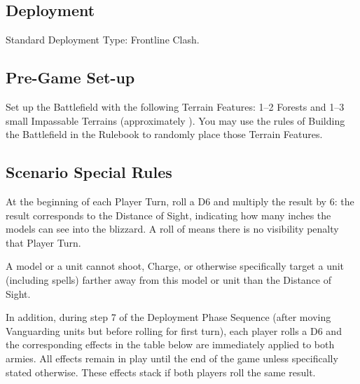 
\label{WeathertheStorm}


\subsection*{Deployment}

Standard Deployment Type: Frontline Clash.


\subsection*{Pre-Game Set-up}

Set up the Battlefield with the following Terrain Features: 1--2 Forests and 1--3 small Impassable Terrains (approximately ). You may use the rules of Building the Battlefield in the Rulebook to randomly place those Terrain Features.

\subsection*{Scenario Special Rules}

At the beginning of each Player Turn, roll a D6 and multiply the result by 6: the result corresponds to the Distance of Sight, indicating how many inches the models can see into the blizzard. A roll of  means there is no visibility penalty that Player Turn.

A model or a unit cannot shoot, Charge, or otherwise specifically target a unit (including spells) farther away from this model or unit than the Distance of Sight.

In addition, during step 7 of the Deployment Phase Sequence (after moving Vanguarding units but before rolling for first turn), each player rolls a D6 and the corresponding effects in the table below are immediately applied to both armies. All effects remain in play until the end of the game unless specifically stated otherwise. These effects stack if both players roll the same result.

